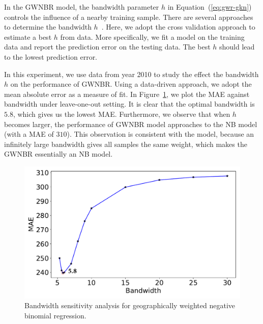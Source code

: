 In the GWNBR model, the bandwidth parameter $h$ in Equation~(\ref{eq:gwr-gkn}) controls the influence of a nearby training sample. There are several approaches to determine the bandwidth $h$~\cite{WLL+15}. Here, we adopt the cross validation approach to estimate a best $h$ from data. More specifically, we fit a model on the training data and report the prediction error on the testing data. The best $h$ should lead to the lowest prediction error.


In this experiment, we use data from year 2010 to study the effect the bandwidth $h$ on the performance of GWNBR. Using a data-driven approach, we adopt the mean absolute error as a measure of fit. In Figure~\ref{fig:gwnbr-h}, we plot the MAE against bandwidth under leave-one-out setting. It is clear that the optimal bandwidth is $5.8$, which gives us the lowest MAE. Furthermore, we observe that when $h$ becomes larger, the performance of GWNBR model approaches to the NB model (with a MAE of $310$). This observation is consistent with the model, because an infinitely large bandwidth gives all samples the same weight, which makes the GWNBR essentially  an NB model. 

\begin{figure}[h]
	\centering
	\includegraphics[width=0.7\linewidth]{fig/para_sensitive.pdf}
	\caption{Bandwidth sensitivity analysis for geographically weighted negative binomial regression.}
	\label{fig:gwnbr-h}
\vspace{-3mm}
\end{figure}




